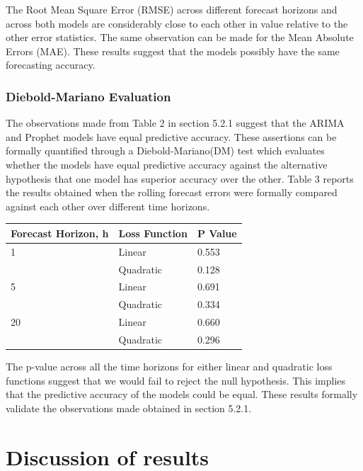 \documentclass[12pt,a4paper]{article}
\numberwithin{equation}{section}
\numberwithin{figure}{section}
\numberwithin{table}{section}
\let\origtable\table
\let\endorigtable\endtable
\renewenvironment{table}[1][2] {
    \expandafter\origtable\expandafter[H]
} {
    \endorigtable
}
\begin{document}
The Root Mean Square Error (RMSE) across different forecast horizons and
across both models are considerably close to each other in value
relative to the other error statistics. The same observation can be made
for the Mean Absolute Errors (MAE). These results suggest that the
models possibly have the same forecasting accuracy.

\subsubsection{Diebold-Mariano
Evaluation}\label{diebold-mariano-evaluation-1}

The observations made from Table 2 in section 5.2.1 suggest that the
ARIMA and Prophet models have equal predictive accuracy. These
assertions can be formally quantified through a Diebold-Mariano(DM) test
which evaluates whether the models have equal predictive accuracy
against the alternative hypothesis that one model has superior accuracy
over the other. Table 3 reports the results obtained when the rolling
forecast errors were formally compared against each other over different
time horizons.

\begin{table}[H]
\centering
\caption{Results of the Diebold-Mariano Hypothesis Test for different loss functions} 
\begin{tabular}{lll}
  \hline
Forecast Horizon, h & Loss Function & P Value \\ 
  \hline
1 & Linear & 0.553 \\ 
    & Quadratic & 0.128 \\ 
  5 & Linear & 0.691 \\ 
    & Quadratic & 0.334 \\ 
  20 & Linear & 0.660 \\ 
    & Quadratic & 0.296 \\ 
   \hline
\end{tabular}
\end{table}

The p-value across all the time horizons for either linear and quadratic
loss functions suggest that we would fail to reject the null hypothesis.
This implies that the predictive accuracy of the models could be equal.
These results formally validate the observations made obtained in
section 5.2.1.

\section{Discussion of results}\label{discussion-of-results}
\end{document}

